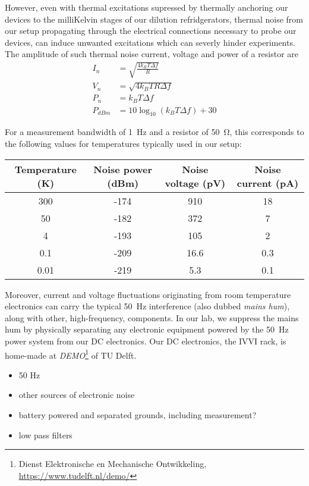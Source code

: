 However, even with thermal excitations supressed by thermally anchoring our devices to the milliKelvin stages of our dilution refridgerators, thermal noise from our setup propagating through the electrical connections necessary to probe our devices, can induce unwanted excitations which can severly hinder experiments.
The amplitude of such thermal noise current, voltage and power of a resistor are
\begin{align}
I_n &= \sqrt{\frac{4k_B T\Delta f}{R}} \\
V_n &= \sqrt{4k_B T R\Delta f} \\
P_n &= k_B T \Delta f \\
P_{dBm} &= 10\log_{10}(k_B T\Delta f)+30
\end{align}

For a measurement bandwidth of \SI{1}{\hertz} and a resistor of \SI{50}{\ohm}, this corresponds to the following values for temperatures typically used in our setup:

\begin{center}
\begin{tabular}{cccc}
	\hline \hline
	Temperature (\si{\kelvin}) & Noise power (\si{dBm}) & Noise voltage (\si{\pico\volt}) & Noise current (\si{\pico\ampere})\\ 
	\hline 
	300 & -174 & 910 & 18 \\ 
	50 & -182 & 372 & 7 \\ 
	4 & -193 & 105 & 2 \\ 
	0.1 & -209 & 16.6 & 0.3 \\ 
	0.01 & -219 & 5.3 & 0.1 \\ 
	\hline \hline
\end{tabular}
\end{center}

Moreover, current and voltage fluctuations originating from room temperature electronics can carry the typical \SI{50}{\hertz} interference (also dubbed \textit{mains hum}), along with other, high-frequency, components.
In our lab, we suppress the mains hum by physically separating any electronic equipment powered by the \SI{50}{\hertz} power system from our DC electronics.
Our DC electronics, the IVVI rack, is home-made at \textit{DEMO}\footnote{Dienst Elektronische en Mechanische Ontwikkeling, \url{https://www.tudelft.nl/demo/}} of TU Delft.
\begin{itemize}
	\item 50 Hz
	\item other sources of electronic noise
	\item battery powered and separated grounds, including measurement?
	\item low pass filters
\end{itemize}


